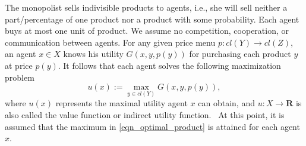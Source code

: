 \documentclass[a4paper, 11pt]{amsart}
\numberwithin{equation}{section}
\theoremstyle{plain}
\theoremstyle{definition}
\theoremstyle{remark}
\newcommand{\R}{\mathbf{R}}
\begin{document}
The monopolist sells indivisible products to agents, i.e., she will sell neither a part/percentage of one product nor a product with some probability. Each agent buys at most one unit of product. We assume no competition, cooperation, or communication between agents. For any given price menu $p: cl(Y) \longrightarrow cl(Z)$, an agent $x \in X$ knows his utility $G(x,y,p(y))$ for purchasing each product $y$ at price $p(y)$. It follows that each agent solves the following maximization problem 
\begin{equation}\label{eqn_optimal_product}
	u(x):=\max_{y \in cl(Y)} G(x, y, p(y)),
\end{equation}
where $u(x)$ represents the maximal utility agent $x$ can obtain, and $u: X \longrightarrow \R$ is also called the value function or indirect utility function.%
~At this point, it is assumed that the maximum in \eqref{eqn_optimal_product} is attained for each agent $x$.
\medskip
\end{document}

